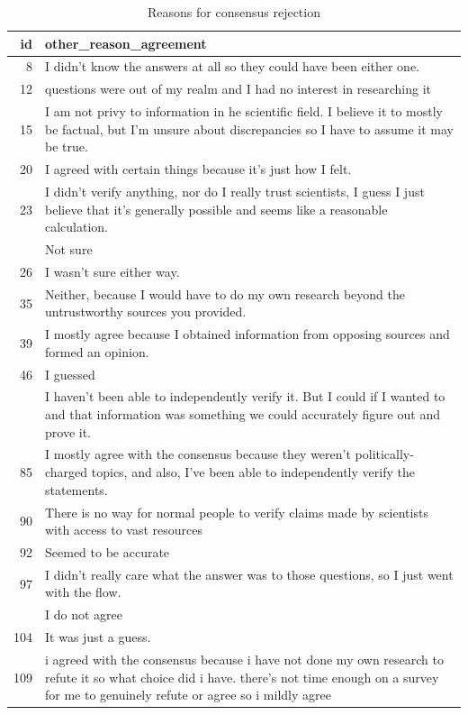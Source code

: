 \documentclass[
  doc,floatsintext]{apa6}
\begin{document}
\begin{longtable}[t]{>{}r>{\raggedright\arraybackslash}p{30em}}
\caption{\label{tab:exp4-other-reasons-acceptance}Reasons for consensus rejection}\\
\toprule
id & other\_reason\_agreement\\
\midrule
8 & I didn’t know the answers at all so they could have been either one.\\
12 & questions were out of my realm and I had no interest in researching it\\
15 & I am not privy to information in he scientific field. I believe it to mostly be factual, but I'm unsure about discrepancies so I have to assume it may be true.\\
20 & I agreed with certain things because it's just how I felt.\\
23 & I didn't verify anything, nor do I really trust scientists, I guess I just believe that it's generally possible and seems like a reasonable calculation.\\
\addlinespace
25 & Not sure\\
26 & I wasn't sure either way.\\
35 & Neither, because I would have to do my own research beyond the untrustworthy sources you provided.\\
39 & I mostly agree because I obtained information from opposing sources and formed an opinion.\\
46 & I guessed\\
\addlinespace
63 & I haven't been able to independently verify it.  But I could if I wanted to and that information was something we could accurately figure out and prove it.\\
85 & I mostly agree with the consensus because they weren't politically-charged topics, and also, I've been able to independently verify the statements.\\
90 & There is no way for normal people to verify claims made by scientists with access to vast resources\\
92 & Seemed to be accurate\\
97 & I didn't really care what the answer was to those questions, so I just went with the flow.\\
\addlinespace
99 & I do not agree\\
104 & It was just a guess.\\
109 & i agreed with the consensus because i have not done my own research to refute it so what choice did i have. there’s not time enough on a survey for me to genuinely refute or agree so i mildly agree\\

\end{longtable}
\end{document}
